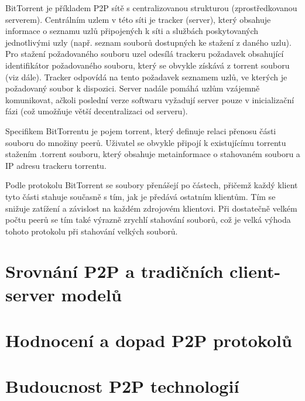 \documentclass[10pt,twoside,czech,a4paper]{article}
\begin{document}
BitTorrent je příkladem P2P sítě s centralizovanou strukturou (zprostředkovanou serverem).
Centrálním uzlem v této síti je tracker (server), který obsahuje informace o seznamu uzlů připojených k síti a službách poskytovaných jednotlivými uzly (např. seznam souborů dostupných ke stažení z daného uzlu).
Pro stažení požadovaného souboru uzel odesílá trackeru požadavek obsahující identifikátor požadovaného souboru, který se obvykle získává z torrent souboru (viz dále).
Tracker odpovídá na tento požadavek seznamem uzlů, ve kterých je požadovaný soubor k dispozici\cite{Radchenko2012}.
Server nadále pomáhá uzlům vzájemně komunikovat, ačkoli poslední verze softwaru vyžadují server pouze v inicializační fázi (což umožňuje větší decentralizaci od serveru)\cite{Lande2008}.

Specifikem BitTorrentu je pojem torrent, který definuje relaci přenosu části souboru do množiny peerů.
Uživatel se obvykle připojí k existujícímu torrentu stažením .torrent souboru, který obsahuje metainformace o stahovaném souboru a IP adresu trackeru torrentu\cite{Legout2005}.

Podle protokolu BitTorrent se soubory přenášejí po částech, přičemž každý klient tyto části stahuje současně s tím, jak je předává ostatním klientům.
Tím se snižuje zatížení a závislost na každém zdrojovém klientovi\cite{Lande2008}.
Při dostatečně velkém počtu peerů se tím také výrazně zrychlí stahování souborů, což je velká výhoda tohoto protokolu při stahování velkých souborů\cite{Barakat2004}.


\section{Srovnání P2P a tradičních client-server modelů}


\section{Hodnocení a dopad P2P protokolů}


\section{Budoucnost P2P technologií}



\end{document}
